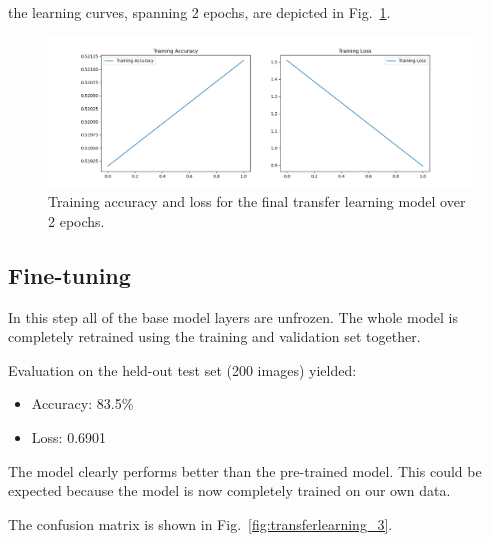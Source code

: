 \documentclass[conference]{IEEEtran}
\begin{document}
the learning curves, spanning 2 epochs, are depicted in Fig.~\ref{fig:transferlearning_2}.

\begin{figure}[htbp]
	\centerline{\includegraphics[width=\linewidth]{Images/Transferlearning_2.png}}
	\caption{Training accuracy and loss for the final transfer learning model over 2 epochs.}
	\label{fig:transferlearning_2}
\end{figure}

\subsection{Fine-tuning}
In this step all of the base model layers are unfrozen. The whole model is completely retrained using the training and validation set together.

Evaluation on the held-out test set (200 images) yielded:

\begin{itemize}
	\item Accuracy: 83.5\%
	\item Loss: 0.6901
\end{itemize}
\vspace{0.5cm}

The model clearly performs better than the pre-trained model. This could be expected because the model is now completely trained on our own data.

The confusion matrix is shown in Fig.~\ref{fig:transferlearning_3}.
\end{document}
